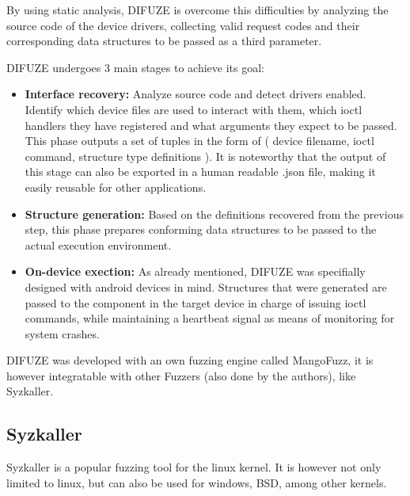 By using static analysis, DIFUZE is overcome this difficulties by analyzing the source code of the device drivers,
collecting valid request codes and their corresponding data structures to be passed as a third parameter.

DIFUZE undergoes 3 main stages to achieve its goal:

\begin{itemize}
  \item \textbf{Interface recovery:} Analyze source code and detect drivers enabled. Identify which device files are used to interact with them, which ioctl handlers they have registered and what arguments they expect to be passed. This phase outputs a set of tuples in the form of ( device filename, ioctl command, structure type definitions ). It is noteworthy that the output of this stage can also be exported in a human readable .json file, making it easily reusable for other applications.
  \item \textbf{Structure generation:} Based on the definitions recovered from the previous step, this phase prepares conforming data structures to be passed to the actual execution environment.
  \item \textbf{On-device exection:} As already mentioned, DIFUZE was specifially designed with android devices in mind. Structures that were generated are passed to the component in the target device in charge of issuing ioctl commands, while maintaining a heartbeat signal as means of monitoring for system crashes.
\end{itemize}

DIFUZE was developed with an own fuzzing engine called MangoFuzz, it is however integratable with other Fuzzers (also done by the authors), like Syzkaller.



\subsection{Syzkaller}

Syzkaller is a popular fuzzing tool for the linux kernel. It is however not only limited to linux, but can also be used for windows, BSD, among other
kernels.

